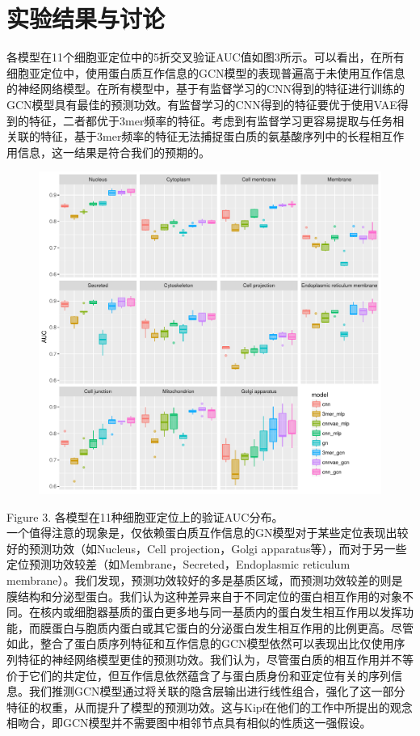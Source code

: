 \documentclass[a4paper,UTF8]{article}
\begin{document}
\section{实验结果与讨论}

各模型在11个细胞亚定位中的5折交叉验证AUC值如图3所示。可以看出，在所有细胞亚定位中，使用蛋白质互作信息的GCN模型的表现普遍高于未使用互作信息的神经网络模型。在所有模型中，基于有监督学习的CNN得到的特征进行训练的GCN模型具有最佳的预测功效。有监督学习的CNN得到的特征要优于使用VAE得到的特征，二者都优于3mer频率的特征。考虑到有监督学习更容易提取与任务相关联的特征，基于3mer频率的特征无法捕捉蛋白质的氨基酸序列中的长程相互作用信息，这一结果是符合我们的预期的。

\begin{figure}[H]
	\centering\includegraphics[scale=0.7]{../result/test_performance_AUC.pdf}
\end{figure}
Figure 3. 各模型在11种细胞亚定位上的验证AUC分布。\\

一个值得注意的现象是，仅依赖蛋白质互作信息的GN模型对于某些定位表现出较好的预测功效（如Nucleus，Cell projection，Golgi apparatus等），而对于另一些定位预测功效较差（如Membrane，Secreted，Endoplasmic reticulum membrane）。我们发现，预测功效较好的多是基质区域，而预测功效较差的则是膜结构和分泌型蛋白。我们认为这种差异来自于不同定位的蛋白相互作用的对象不同。在核内或细胞器基质的蛋白更多地与同一基质内的蛋白发生相互作用以发挥功能，而膜蛋白与胞质内蛋白或其它蛋白的分泌蛋白发生相互作用的比例更高。尽管如此，整合了蛋白质序列特征和互作信息的GCN模型依然可以表现出比仅使用序列特征的神经网络模型更佳的预测功效。我们认为，尽管蛋白质的相互作用并不等价于它们的共定位，但互作信息依然蕴含了与蛋白质身份和亚定位有关的序列信息。我们推测GCN模型通过将关联的隐含层输出进行线性组合，强化了这一部分特征的权重，从而提升了模型的预测功效。这与Kipf在他们的工作中所提出的观念相吻合，即GCN模型并不需要图中相邻节点具有相似的性质这一强假设。
\end{document}
